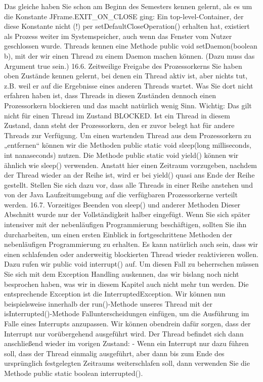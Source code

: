 Das gleiche haben Sie schon am Beginn des Semesters kennen gelernt, als es um die Konstante JFrame.EXIT_ON_CLOSE ging: Ein top-level-Container, der diese Konstante nicht (!) per setDefaultCloseOperation() erhalten hat, existiert als Prozess weiter im Systemspeicher, auch wenn das Fenster vom Nutzer geschlossen wurde.
Threads kennen eine Methode public void setDaemon(boolean b), mit der wir einen Thread zu einem Daemon machen können. (Dazu muss das Argument true sein.)
16.6.	Zeitweilige Freigabe des Prozessorkerns
Sie haben oben Zustände kennen gelernt, bei denen ein Thread aktiv ist, aber nichts tut, z.B. weil er auf die Ergebnisse eines anderen Threads wartet. Was Sie dort nicht erfahren haben ist, dass Threads in diesen Zuständen dennoch einen Prozessorkern blockieren und das macht natürlich wenig Sinn.
Wichtig: Das gilt nicht für einen Thread im Zustand BLOCKED. Ist ein Thread in diesem Zustand, dann steht der Prozessorkern, den er zuvor belegt hat für andere Threads zur Verfügung.
Um einen wartenden Thread aus dem Prozessorkern zu „entfernen“ können wir die Methoden 
public static void sleep(long milliseconds, int nanaseconds) nutzen.  
Die Methode public static void yield() können wir ähnlich wie sleep() verwenden. Anstatt hier einen Zeitraum vorzugeben, nachdem der Thread wieder an der Reihe ist, wird er bei yield() quasi ans Ende der Reihe gestellt. Stellen Sie sich dazu vor, dass alle Threads in einer Reihe anstehen und von der Java Laufzeitumgebung auf die verfügbaren Prozessorkerne verteilt werden.
16.7.	Vorzeitiges Beenden von sleep() und anderer Methoden
Dieser Abschnitt wurde nur der Vollständigkeit halber eingefügt. Wenn Sie sich später intensiver mit der nebenläufigen Programmierung beschäftigen, sollten Sie ihn durcharbeiten, um einen ersten Einblick in fortgeschrittene Methoden der nebenläufigen Programmierung zu erhalten.
Es kann natürlich auch sein, dass wir einen schlafenden oder anderweitig blockierten Thread wieder reaktivieren wollen. Dazu rufen wir public void interrupt() auf. Um diesen Fall zu beherrschen müssen Sie sich mit dem Exception Handling auskennen, das wir bislang noch nicht besprochen haben, was wir in diesem Kapitel auch nicht mehr tun werden. Die entsprechende Exception ist die InterruptedException.
Wir können nun beispielsweise innerhalb der run()-Methode unseres Thread mit der isInterrupted()-Methode Fallunterscheidungen einfügen, um die Ausführung im Falle eines Interrupts anzupassen.
Wir können obendrein dafür sorgen, dass der Interrupt nur vorübergehend ausgeführt wird. Der Thread befindet sich dann anschließend wieder im vorigen Zustand:
-	Wenn ein Interrupt nur dazu führen soll, dass der Thread einmalig ausgeführt, aber dann bis zum Ende des ursprünglich festgelegten Zeitraums weiterschlafen soll, dann verwenden Sie die Methode public static boolean interrupted().

